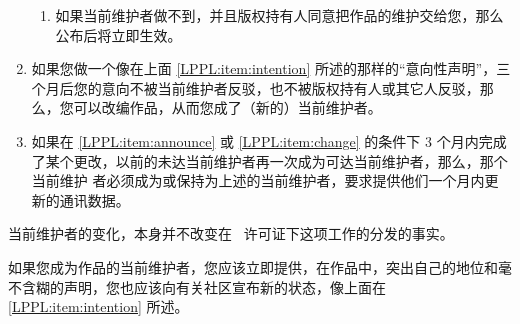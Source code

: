\begin{LPPLicense}
\begin{enumerate}
\begin{enumerate}
                \item\label{LPPL:item:announce} 如果当前维护者做不到，并且版权持有人同意把作品的维护交给您，那么公布后将立即生效。
            \end{enumerate}
        \item\label{LPPL:item:change} 如果您做一个像在上面 \ref{LPPL:item:intention} 所述的那样的``意向性声明''，三个月后您的意向不被当前维护者反驳，也不被版权持有人或其它人反驳，那么，您可以改编作品，从而您成了（新的）当前维护者。
        \item 如果在 \ref{LPPL:item:announce} 或 \ref{LPPL:item:change} 的条件下 3 个月内完成了某个更改，以前的未达当前维护者再一次成为可达当前维护者，那么，那个当前维护 者必须成为或保持为上述的当前维护者，要求提供他们一个月内更新的通讯数据。
    \end{enumerate}
    当前维护者的变化，本身并不改变在 \LPPL\ 许可证下这项工作的分发的事实。


    如果您成为作品的当前维护者，您应该立即提供，在作品中，突出自己的地位和毫不含糊的声明，您也应该向有关社区宣布新的状态，像上面在 \ref{LPPL:item:intention} 所述。


    \label{LPPL:Distribute}


\end{LPPLicense}
